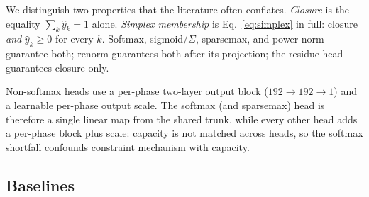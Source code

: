 \documentclass[preprint,12pt,authoryear]{elsarticle}
\begin{document}
We distinguish two properties that the literature often conflates.
\emph{Closure} is the equality $\sum_k \hat y_k = 1$ alone. \emph{Simplex
membership} is Eq.~\eqref{eq:simplex} in full: closure \emph{and}
$\hat y_k \ge 0$ for every $k$. Softmax, sigmoid/$\Sigma$, sparsemax, and
power-norm guarantee both; renorm guarantees both after its projection;
the residue head guarantees closure only.

Non-softmax heads use a per-phase two-layer output block ($192 \to 192 \to 1$)
and a learnable per-phase output scale. The softmax (and sparsemax) head is
therefore a single linear map from the shared trunk, while every other head
adds a per-phase block plus scale: capacity is not matched across heads, so
the softmax shortfall confounds constraint mechanism with capacity.

\subsection{Baselines}
\end{document}
